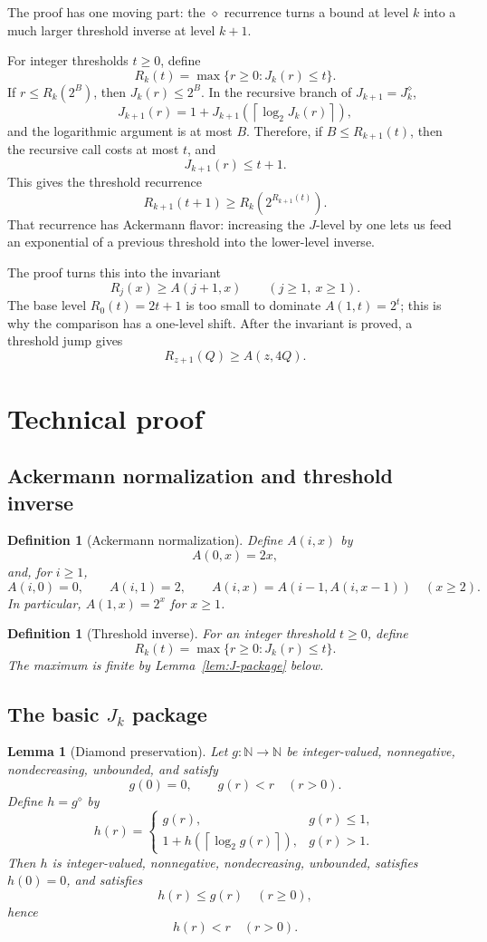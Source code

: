 ﻿\documentclass[11pt]{article}
\newtheorem{lemma}[theorem]{Lemma}
\newtheorem{definition}[theorem]{Definition}
\newcommand{\N}{\mathbb{N}}
\newcommand{\ceil}[1]{\left\lceil #1 \right\rceil}
\begin{document}
The proof has one moving part: the $\diamond$ recurrence turns a bound at level $k$ into a much larger threshold inverse at level $k+1$.

For integer thresholds $t\ge0$, define
\[
R_k(t)=\max\{r\ge 0:J_k(r)\le t\}.
\]
If $r\le R_k(2^B)$, then $J_k(r)\le 2^B$.  In the recursive branch of $J_{k+1}=J_k^\diamond$,
\[
J_{k+1}(r)=1+J_{k+1}(\ceil{\log_2J_k(r)}),
\]
and the logarithmic argument is at most $B$.  Therefore, if $B\le R_{k+1}(t)$, then the recursive call costs at most $t$, and
\[
J_{k+1}(r)\le t+1.
\]
This gives the threshold recurrence
\[
R_{k+1}(t+1)\ge R_k(2^{R_{k+1}(t)}).
\]
That recurrence has Ackermann flavor: increasing the $J$-level by one lets us feed an exponential of a previous threshold into the lower-level inverse.

The proof turns this into the invariant
\[
R_j(x)\ge A(j+1,x)
\qquad(j\ge1,\ x\ge1).
\]
The base level $R_0(t)=2t+1$ is too small to dominate $A(1,t)=2^t$; this is why the comparison has a one-level shift.  After the invariant is proved, a threshold jump gives
\[
R_{z+1}(Q)\ge A(z,4Q).
\]

\section{Technical proof}

\subsection{Ackermann normalization and threshold inverse}

\begin{definition}[Ackermann normalization]
Define $A(i,x)$ by
\[
A(0,x)=2x,
\]
and, for $i\ge 1$,
\[
A(i,0)=0,
\qquad
A(i,1)=2,
\qquad
A(i,x)=A(i-1,A(i,x-1))\quad(x\ge2).
\]
In particular, $A(1,x)=2^x$ for $x\ge1$.
\end{definition}

\begin{definition}[Threshold inverse]
For an integer threshold $t\ge0$, define
\[
R_k(t)=\max\{r\ge0:J_k(r)\le t\}.
\]
The maximum is finite by Lemma~\ref{lem:J-package} below.
\end{definition}

\subsection{The basic \texorpdfstring{$J_k$}{Jk} package}

\begin{lemma}[Diamond preservation]\label{lem:diamond-preservation}
Let $g:\N\to\N$ be integer-valued, nonnegative, nondecreasing, unbounded, and satisfy
\[
g(0)=0,
\qquad
g(r)<r\quad(r>0).
\]
Define $h=g^\diamond$ by
\[
h(r)=
\begin{cases}
g(r),&g(r)\le1,\\[4pt]
1+h(\ceil{\log_2 g(r)}),&g(r)>1.
\end{cases}
\]
Then $h$ is integer-valued, nonnegative, nondecreasing, unbounded, satisfies $h(0)=0$, and satisfies
\[
h(r)\le g(r)\quad(r\ge0),
\]
hence
\[
h(r)<r\quad(r>0).
\]
\end{lemma}
\end{document}
